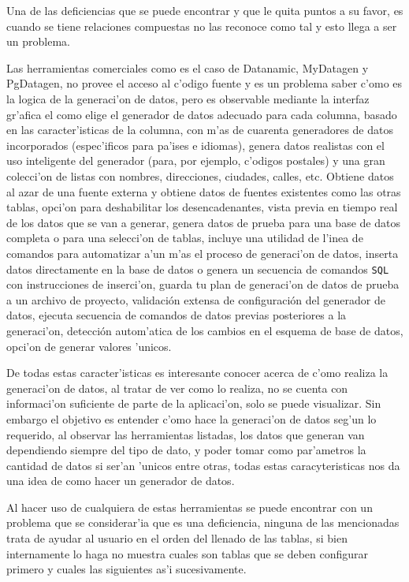 Una de las deficiencias que se puede encontrar y que le quita puntos a su favor, es cuando se tiene relaciones compuestas no las reconoce como tal y esto llega a ser un problema.

Las herramientas comerciales como es el caso de Datanamic, MyDatagen y PgDatagen, no provee el acceso al c'odigo fuente y es un problema saber c'omo es la logica de la generaci'on de datos, pero es observable mediante la interfaz gr'afica el como elige el generador de datos adecuado para cada columna, basado en las caracter'isticas de la columna, con m'as de cuarenta generadores de datos incorporados (espec'ificos para pa'ises e idiomas), genera datos realistas con el uso inteligente del generador (para, por ejemplo, c'odigos postales) y una gran colecci'on de listas con nombres, direcciones, ciudades, calles, etc. Obtiene datos al azar de una fuente externa y obtiene datos de fuentes existentes como las otras tablas, opci'on para deshabilitar los desencadenantes, vista previa en tiempo real de los datos que se van a generar, genera datos de prueba para una base de datos completa o para una selecci'on de tablas, incluye una utilidad de l'inea de comandos para automatizar a'un m'as el proceso de generaci'on de datos, inserta datos directamente en la base de datos o genera un secuencia de comandos \texttt{SQL} con instrucciones de inserci'on, guarda tu plan de generaci'on de datos de prueba a un archivo de proyecto, validación extensa de configuraci\'on del generador de datos, ejecuta secuencia de comandos de datos previas posteriores a la generaci'on, detecci\'on autom'atica de los cambios en el esquema de base de datos, opci'on de generar valores 'unicos.

De todas estas caracter'isticas es interesante conocer acerca de c'omo realiza la generaci'on de datos, al tratar de ver como lo realiza, no se cuenta con informaci'on suficiente de parte de la aplicaci'on, solo se puede visualizar. Sin embargo el objetivo es entender c'omo hace la generaci'on de datos seg'un lo requerido, al observar las herramientas listadas, los datos que generan van dependiendo siempre del tipo de dato, y poder tomar como par'ametros la cantidad de datos si ser'an 'unicos entre otras, todas estas caracyteristicas nos da una idea de como hacer un generador de datos.

Al hacer uso de cualquiera de estas herramientas se puede encontrar con un problema que se considerar'ia que es una deficiencia, ninguna de las mencionadas trata de ayudar al usuario en el orden del llenado de las tablas, si bien internamente lo haga no muestra cuales son tablas que se deben configurar primero y cuales las siguientes as'i sucesivamente.